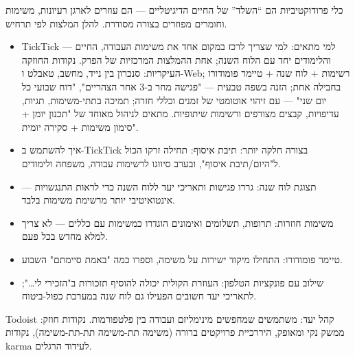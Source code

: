 


כלי פרודוקטיביות הם “השלד” של החיים הדיגיטליים — הם עוזרים לארגן רעיונות, משימות וחומרים מפוזרים בצורה מסודרת. להלן המלצות לפי תרחיש.


\begin{itemize}
  \item TickTick — למי מתאים: למי שצריך לרכז במקום אחד את משימות העבודה, החיים והלימודים יחד עם הלוח השנה; אחת ההמלצות המרכזיות של הפרק. נקודות החוזקה העיקריות: סנכרון בין נייד, מחשב, טאבלט ו-Web; רשימות + לוח שנה + טיימר פומודורו בחבילה אחת; הזנה בשפה טבעית — "פגישה מחר ב-3 אחר הצהריים", "דוח שבועי כל יום שני" — עם זיהוי אוטומטי של זמנים וכללי חזרה; תמיכה בתתי-משימות, תגיות, עדיפויות, קבצים מצורפים ורשימות שיתופיות. מתאים לניהול מאוחד של "תכנון יומן + סימון משימות + סקירה יומית".
  \item איך להשתמש ב-TickTick בצורה חלקה יותר: תיבת איסוף: תחילה זרקו הכול ל"היום/תיבת איסוף", ובערב סיווגו לרשימות עבודה, משפחה ולימודים.
  \item תצוגת לוח שנה: גררו פגישות ותאריכי יעד ללוח השנה כדי לראות התנגשויות — אינטואיטיבי יותר מרשימת משימות בלבד.
  \item משימות חוזרות: תרופות, תשלומים ואימונים הוגדרו כמשימות עם כללים — לא צריך למלא מחדש בכל פעם.
  \item טיימר פומודורו: התחילו מיקוד ישירות על משימה, וספרו כמה "באמת סיימתם" השבוע.
  \item שילוב עם פונקציות הטלפון: העוזרת הקולית יכולה להוסיף תזכורות ב"הזכירי לי…"; לתאריכי יעד חשובים הפעילו גם לוח שנה במערכת כפול-ביטוח.
\end{itemize}

Todoist קהל יעד: משתמשים שמחפשים מינימליזם ועבודה בין פלטפורמות. נקודות חוזק: ממשק נקי ומאופק, היררכיית פרויקטים ברורה (משימה תת-משימה תת-תת-משימה), נקודות karma לעידוד הרגלים.

